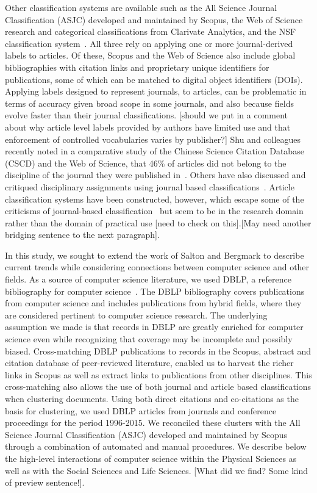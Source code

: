 Other classification systems are available such as the All Science Journal Classification (ASJC) developed and maintained by Scopus, the Web of Science research and categorical classifications from Clarivate Analytics, and the NSF classification system~\cite{nsf_classification}. All three rely on applying one or more journal-derived labels to articles.  Of these, Scopus and the Web of Science also include global bibliographies with citation links and proprietary unique identifiers for publications, some of which can be matched to digital object identifiers (DOIs). Applying labels designed to represent journals, to articles, can be problematic in terms of accuracy given broad scope in some journals,  and also because fields evolve faster than their journal classifications. [should we put in a comment about why article level labels provided by authors have limited use and that enforcement of controlled vocabularies varies by publisher?] Shu and colleagues recently noted in a comparative study of the Chinese Science Citation Database (CSCD) and the Web of Science, that 46\% of articles did not belong to the discipline of the journal they were published in~\cite{shu_comparing_2019}. Others have also discussed and critiqued disciplinary assignments using journal based classifications~\cite{wang_large-scale_2016,perianes-rodriguez_comparison_2017}. Article classification systems have been constructed, however, which escape some of the criticisms of journal-based classification~\cite{traag_louvain_2019,boyack_classification_2014,waltman_new_2012} but seem to be in the research domain rather than the domain of practical use [need to check on this].[May need another bridging sentence to the next paragraph].
 
In this study, we sought to extend the work of Salton and Bergmark to describe current trends while considering connections between computer science and other fields. As a source of computer science literature, we used DBLP, a reference bibliography for computer science~\cite{dblp_ref}. The DBLP bibliography covers publications from computer science and includes publications from hybrid fields, where they are considered pertinent to computer science research. The underlying assumption we made is that records in DBLP are greatly enriched for computer science even while recognizing that coverage may be incomplete and possibly biased. Cross-matching DBLP publications to records in the Scopus, abstract and citation database of peer-reviewed literature, enabled us to harvest the richer links in Scopus as well as extract links to publications from other disciplines. This cross-matching also allows the use of both journal and article based classifications when clustering documents. Using both direct citations and co-citations as the basis for clustering, we used DBLP articles from journals and conference proceedings for the period 1996-2015. We reconciled these clusters with the All Science Journal Classification (ASJC) developed and maintained by Scopus through a combination of automated and manual procedures. We describe below the high-level interactions of computer science within the Physical Sciences as well as with the Social Sciences and Life Sciences. [What did we find? Some kind of preview sentence!].


